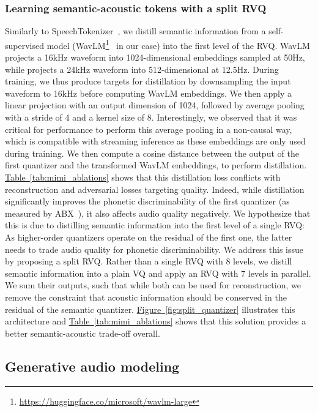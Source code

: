 \subsubsection{Learning semantic-acoustic tokens with a split RVQ}
\label{sec:splitrvq}
Similarly to SpeechTokenizer~\citep{zhang2024speechtokenizer}, we distill semantic information from a self-supervised model (WavLM\footnote{\url{https://huggingface.co/microsoft/wavlm-large}}~\citep{wavlm} in our case) into the first level of the RVQ. WavLM projects a 16kHz waveform into 1024-dimensional embeddings sampled at 50Hz, while \mimi projects a 24kHz waveform into 512-dimensional at 12.5Hz. During training, we thus produce targets for distillation by downsampling the input waveform to 16kHz before computing WavLM embeddings. We then apply a linear projection with an output dimension of 1024, followed by average pooling with a stride of 4 and a kernel size of 8. Interestingly, we observed that it was critical for performance to perform this average pooling in a non-causal way, which is compatible with streaming inference as these embeddings are only used during training. We then compute a cosine distance between the output of the first quantizer and the transformed WavLM embeddings, to perform distillation. \hyperref[tab:mimi_ablations]{Table~\ref{tab:mimi_ablations}} shows that this distillation loss conflicts with reconstruction and adversarial losses targeting quality. Indeed, while distillation significantly improves the phonetic discriminability of the first quantizer (as measured by ABX~\citep{abx}), it also affects audio quality negatively. We hypothesize that this is due to distilling semantic information into the first level of a single RVQ: As higher-order quantizers operate on the residual of the first one, the latter needs to trade audio quality for phonetic discriminability. We address this issue by proposing a split RVQ. Rather than a single RVQ with 8 levels, we distill semantic information into a plain VQ and apply an RVQ with 7 levels in parallel. We sum their outputs, such that while both can be used for reconstruction, we remove the constraint that acoustic information should be conserved in the residual of the semantic quantizer. \hyperref[fig:split_quantizer]{Figure~\ref{fig:split_quantizer}} illustrates this architecture and \hyperref[tab:mimi_ablations]{Table~\ref{tab:mimi_ablations}} shows that this solution provides a better semantic-acoustic trade-off overall.


\subsection{Generative audio modeling}
\label{sec:modeling}

